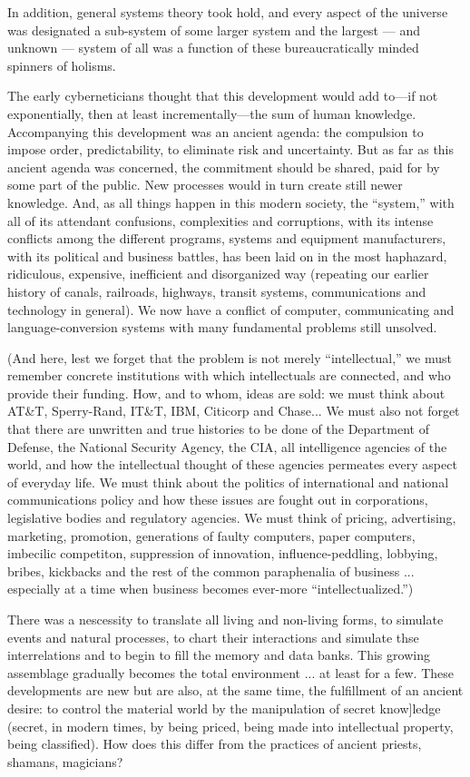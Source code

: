 In addition, general systems theory took
hold, and every aspect of the universe was
designated a sub-system of some larger system and the largest --- and unknown --- system
of all was a function of these bureaucratically
minded spinners of holisms.

The early cyberneticians thought that this
development would add to—if not exponentially, then at least incrementally—the sum of
human knowledge. Accompanying this development was an ancient agenda: the compulsion to impose order, predictability, to
eliminate risk and uncertainty. But as far as
this ancient agenda was concerned, the commitment should be shared, paid for by some
part of the public. New processes would in
turn create still newer knowledge. And, as all
things happen in this modern society, the
\enquote{system,}
with
all of its attendant
confusions, complexities and corruptions, with its
intense conflicts among the different programs, systems and equipment 
manufacturers, with its political and business battles, has
been laid on in the most haphazard, ridiculous, expensive, inefficient and disorganized
way (repeating our earlier history of canals,
railroads, highways, transit systems, communications and technology in general). We
now have a conflict of computer, communicating and language-conversion systems
with many fundamental problems still unsolved.


(And here, lest we forget that the problem
is not merely \enquote{intellectual,} we must remember concrete institutions with which
intellectuals are connected,
and who provide their funding. How, and to whom, ideas
are sold: we must think about AT\&T, Sperry-Rand, IT\&T, IBM, Citicorp and Chase... We
must also not forget that there are unwritten
and true histories to be done of the Department of Defense, the National Security Agency, the CIA, all intelligence agencies of the
world, and how the intellectual thought of
these agencies permeates every aspect of
everyday life. We must think about the politics of international and national communications policy and how these issues are
fought out in corporations, legislative bodies
and regulatory agencies. We must think of
pricing, advertising, marketing, promotion,
generations of faulty computers, paper computers, imbecilic
competiton, suppression of innovation, influence-peddling, lobbying,
bribes, kickbacks and the rest of the common
paraphenalia of business ... especially at a
time when business becomes ever-more
\enquote{intellectualized.})

There was a nescessity to translate all
living and non-living forms, to simulate
events and natural processes, to chart their
interactions and simulate thse interrelations
and to begin to fill the memory and data
banks. This growing assemblage gradually
becomes the total environment ... at least
for a few. These developments are new but
are also, at the same time, the fulfillment of
an ancient desire: to control the material
world by the manipulation of secret know]ledge (secret, in modern times, by being
priced, being made into intellectual property, being classified). How does this differ
from the practices of ancient priests, shamans, magicians?

